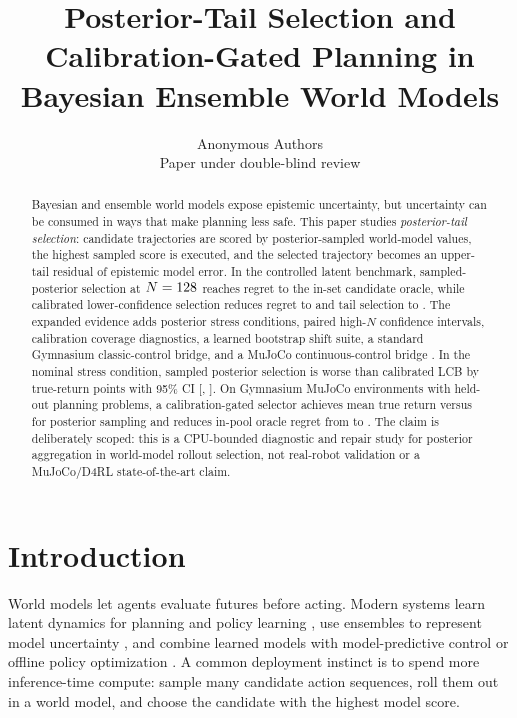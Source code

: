 \documentclass{article}
\title{Posterior-Tail Selection and Calibration-Gated Planning in Bayesian Ensemble World Models}
\author{Anonymous Authors\\
Paper under double-blind review}
\begin{document}
\maketitle

\begin{abstract}
Bayesian and ensemble world models expose epistemic uncertainty, but
uncertainty can be consumed in ways that make planning less safe. This paper
studies \emph{posterior-tail selection}: candidate trajectories are scored by
posterior-sampled world-model values, the highest sampled score is executed,
and the selected trajectory becomes an upper-tail residual of epistemic model
error. In the controlled latent benchmark, sampled-posterior selection at
$N=128{}$ reaches regret \SampleHighRegret{} to the in-set candidate
oracle, while calibrated lower-confidence selection reduces regret to
\PessHighRegret{} and tail selection to \PessHighTail{}. The expanded evidence
adds \VThreeStressConditions{} posterior stress conditions, paired high-$N$
confidence intervals, calibration coverage diagnostics, a learned bootstrap
shift suite, a standard Gymnasium classic-control bridge, and a MuJoCo
continuous-control bridge \citep{towers2024gymnasium,todorov2012mujoco}. In
the nominal stress condition, sampled posterior selection is worse than
calibrated LCB by \VThreeNominalSampleLCBGap{} true-return points with 95\% CI
[\VThreeNominalSampleLCBCILow{}, \VThreeNominalSampleLCBCIHigh{}]. On
\VFourMujocoEnvironments{} Gymnasium MuJoCo environments with
\VFourMujocoProblems{} held-out planning problems, a calibration-gated selector
achieves mean true return \VFourMujocoGateReturn{} versus
\VFourMujocoSampleReturn{} for posterior sampling and reduces in-pool oracle
regret from \VFourMujocoSampleRegret{} to \VFourMujocoGateRegret{}. The claim
is deliberately scoped: this is a CPU-bounded diagnostic and repair study for
posterior aggregation in world-model rollout selection, not real-robot
validation or a MuJoCo/D4RL state-of-the-art claim.
\end{abstract}

\section{Introduction}

World models let agents evaluate futures before acting. Modern systems learn
latent dynamics for planning and policy learning \citep{hafner2019planet,
hafner2020dreamer,hafner2023dreamerv3}, use ensembles to represent model
uncertainty \citep{chua2018pets,lakshminarayanan2017deep}, and combine learned
models with model-predictive control or offline policy optimization
\citep{janner2019mbpo,yu2020mopo,kidambi2020morel,yu2021combo}. A common
deployment instinct is to spend more inference-time compute: sample many
candidate action sequences, roll them out in a world model, and choose the
candidate with the highest model score.
\end{document}
